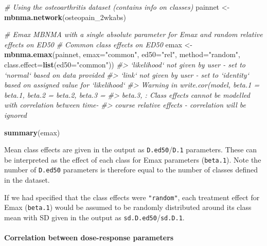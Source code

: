 \documentclass[]{article}
\newenvironment{Shaded}{\begin{snugshade}}{\end{snugshade}}
\newcommand{\CommentTok}[1]{\textcolor[rgb]{0.56,0.35,0.01}{\textit{#1}}}
\newcommand{\DataTypeTok}[1]{\textcolor[rgb]{0.13,0.29,0.53}{#1}}
\newcommand{\KeywordTok}[1]{\textcolor[rgb]{0.13,0.29,0.53}{\textbf{#1}}}
\newcommand{\NormalTok}[1]{#1}
\newcommand{\StringTok}[1]{\textcolor[rgb]{0.31,0.60,0.02}{#1}}
\let\oldparagraph\paragraph
\renewcommand{\paragraph}[1]{\oldparagraph{#1}\mbox{}}
\begin{document}
\begin{Shaded}
\begin{Highlighting}[]
\CommentTok{# Using the osteoarthritis dataset (contains info on classes)}
\NormalTok{painnet <-}\StringTok{ }\KeywordTok{mbnma.network}\NormalTok{(osteopain_2wkabs)}
\end{Highlighting}
\end{Shaded}

\begin{Shaded}
\begin{Highlighting}[]
\CommentTok{# Emax MBNMA with a single absolute parameter for Emax and random relative effects on ED50}
\CommentTok{# Common class effects on ED50}
\NormalTok{emax <-}\StringTok{ }\KeywordTok{mbnma.emax}\NormalTok{(painnet, }\DataTypeTok{emax=}\StringTok{"common"}\NormalTok{, }\DataTypeTok{ed50=}\StringTok{"rel"}\NormalTok{, }\DataTypeTok{method=}\StringTok{"random"}\NormalTok{,}
                   \DataTypeTok{class.effect=}\KeywordTok{list}\NormalTok{(}\DataTypeTok{ed50=}\StringTok{"common"}\NormalTok{))}
\CommentTok{#> `likelihood` not given by user - set to `normal` based on data provided}
\CommentTok{#> `link` not given by user - set to `identity` based on assigned value for `likelihood`}
\CommentTok{#> Warning in write.cor(model, beta.1 = beta.1, beta.2 = beta.2, beta.3 =}
\CommentTok{#> beta.3, : Class effects cannot be modelled with correlation between time-}
\CommentTok{#> course relative effects - correlation will be ignored}
\end{Highlighting}
\end{Shaded}

\begin{Shaded}
\begin{Highlighting}[]
\KeywordTok{summary}\NormalTok{(emax)}
\end{Highlighting}
\end{Shaded}

Mean class effects are given in the output as
\texttt{D.ed50}/\texttt{D.1} parameters. These can be interpreted as the
effect of each class for Emax parameters (\texttt{beta.1}). Note the
number of \texttt{D.ed50} parameters is therefore equal to the number of
classes defined in the dataset.

If we had specified that the class effects were \texttt{"random"}, each
treatment effect for Emax (\texttt{beta.1}) would be assumed to be
randomly distributed around its class mean with SD given in the output
as \texttt{sd.D.ed50}/\texttt{sd.D.1}.

\hypertarget{correlation-between-dose-response-parameters}{%
\paragraph{Correlation between dose-response
parameters}\label{correlation-between-dose-response-parameters}}
\end{document}
